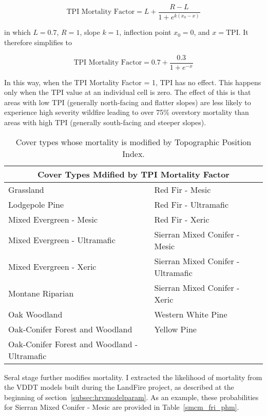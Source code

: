 \begin{itemize}
$$\text{TPI Mortality Factor} = L + \frac{R-L}{1+e^{k(x_0-x)}}$$

in which $L= 0.7$, $R=1$, slope $k=1$, inflection point $x_0=0$, and $x=\text{TPI}$. %
It therefore simplifies to 

$$\text{TPI Mortality Factor} = 0.7 + \frac{0.3}{1+e^{-x}}$$

In this way, when the TPI Mortality Factor = 1, TPI has no effect. This happens only when the TPI value at an individual cell is zero. The effect of this is that areas with low TPI (generally north-facing and flatter slopes) are less likely to experience high severity wildfire leading to over 75\% overstory mortality than areas with high TPI (generally south-facing and steeper slopes).

\begin{table}[htbp]
\footnotesize
\centering
\caption{Cover types whose mortality is modified by Topographic Position Index.}
\label{covtpi_mort}
\begin{tabular}{ll}
\hline
\multicolumn{2}{c}{\textbf{Cover Types Mdified by TPI Mortality Factor}} \\
\hline
Grassland     					& Red Fir - Mesic   			\\
Lodgepole Pine    				& Red Fir - Ultramafic			\\
Mixed Evergreen - Mesic				& Red Fir - Xeric    			\\
Mixed Evergreen - Ultramafic     		& Sierran Mixed Conifer - Mesic    	\\
Mixed Evergreen - Xeric 			& Sierran Mixed Conifer - Ultramafic 	\\
Montane Riparian				& Sierran Mixed Conifer - Xeric 	\\
Oak Woodland 					& Western White Pine			\\
Oak-Conifer Forest and Woodland 		& Yellow Pine 				\\
Oak-Conifer Forest and Woodland - Ultramafic 	&					\\
\hline
\end{tabular}
\end{table}

Seral stage further modifies mortality. I extracted the likelihood of mortality from the VDDT models built during the LandFire project, as described at the beginning of section~\ref{subsec:hrvmodelparam}. As an example, these probabilities for Sierran Mixed Conifer - Mesic are provided in Table~\ref{smcm_fri_phm}.



\end{itemize}

